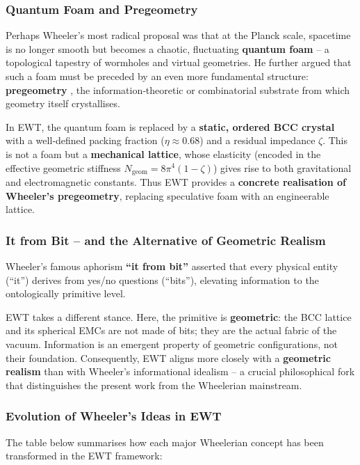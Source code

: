 \documentclass[10pt,a4paper]{article}
\begin{document}
\subsubsection*{Quantum Foam and Pregeometry}
Perhaps Wheeler's most radical proposal was that at the Planck 
scale, spacetime is no longer smooth but becomes a chaotic, 
fluctuating \textbf{quantum foam} \cite{Wheeler1957} – a topological 
tapestry of wormholes and virtual geometries. He further argued 
that such a foam must be preceded by an even more fundamental 
structure: \textbf{pregeometry} \cite{Wheeler1980}, the 
information‑theoretic or combinatorial substrate from which 
geometry itself crystallises.

In EWT, the quantum foam is replaced by a \textbf{static, ordered 
	BCC crystal} with a well‑defined packing fraction ($\eta \approx 0.68$) 
and a residual impedance $\zeta$. This is not a 
foam but a \textbf{mechanical lattice}, whose elasticity (encoded 
in the effective geometric stiffness $N_{\text{geom}} = 8\pi^4(1-\zeta)$) gives rise 
to both gravitational and electromagnetic constants. Thus EWT 
provides a \textbf{concrete realisation of Wheeler's pregeometry}, 
replacing speculative foam with an engineerable lattice.

\subsubsection*{It from Bit – and the Alternative of Geometric Realism}
Wheeler's famous aphorism \textbf{``it from bit''} \cite{Wheeler1990} 
asserted that every physical entity (``it'') derives from 
yes/no questions (``bits''), elevating information to the 
ontologically primitive level.

EWT takes a different stance. Here, the primitive is 
\textbf{geometric}: the BCC lattice and its spherical EMCs are 
not made of bits; they are the actual fabric of the vacuum. 
Information is an emergent property of geometric configurations, 
not their foundation. Consequently, EWT aligns more closely 
with a \textbf{geometric realism} than with Wheeler's 
informational idealism – a crucial philosophical fork 
that distinguishes the present work from the Wheelerian 
mainstream.

\subsubsection*{Evolution of Wheeler's Ideas in EWT}

The table below summarises how each major Wheelerian concept 
has been transformed in the EWT framework:
\end{document}
